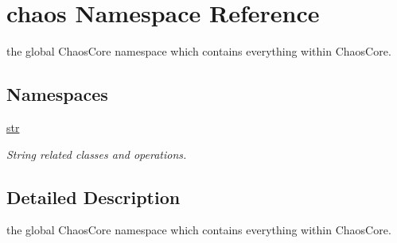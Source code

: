 \hypertarget{namespacechaos}{\section{chaos Namespace Reference}
\label{namespacechaos}
}


the global Chaos\-Core namespace which contains everything within Chaos\-Core.  


\subsection*{Namespaces}
\begin{DoxyCompactItemize}
\item 
\hyperlink{namespacechaos_1_1str}{str}
\begin{DoxyCompactList}\small\item\em String related classes and operations. \end{DoxyCompactList}\end{DoxyCompactItemize}


\subsection{Detailed Description}
the global Chaos\-Core namespace which contains everything within Chaos\-Core. 
